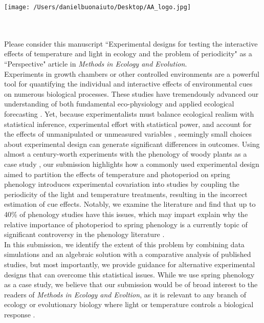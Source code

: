\documentclass[11.5 pt]{article}
\begin{document}


\def\labelitemi{--}
\parindent=24pt
\noindent\texttt{[image: /Users/danielbuonaiuto/Desktop/AA\_logo.jpg]}
\\\\
\\
\vspace{1.5ex}

\noindent Please consider this manuscript ``Experimental designs for testing the interactive effects of temperature and light in ecology and the problem of periodicity" as a ``Perspective" article in \textit{Methods in Ecology and Evolution}.\\

\noindent Experiments in growth chambers or other controlled environments are a powerful tool for quantifying the individual and interactive effects of environmental cues on numerous biological processes. These studies have tremendously advanced our understanding of both fundamental eco-physiology and applied ecological forecasting \citep{Osmond:2004wb}. Yet, because experimentalists must balance ecological realism with statistical inference, experimental effort with statistical power, and account for the effects of unmanipulated or unmeasured variables \citep{schneiner2001}, seemingly small choices about experimental design can generate significant differences in outcomes. Using almost a century-worth experiments with the phenology of woody plants as a case study \citep{wolkovich2019}, our submission highlights how a commonly used experimental design aimed to partition the effects of temperature and photoperiod on spring phenology introduces experimental covariation into studies by coupling the periodicity of the light and temperature treatments, resulting in the incorrect estimation of cue effects. Notably, we examine the literature and find that up to 40\% of phenology studies have this issues, which may impart explain why the relative importance of photoperiod to spring phenology is a currently topic of significant controversy in the phenology literature \citep{koerner2010a,CHUINE:2010wg,Jennifer:2010un,Zohner:2016uz,WAY:2015aa}. \\

\noindent In this submission, we identify the extent of this problem by combining data simulations and an algebraic solution with a comparative analysis of published studies, but most importantly, we provide guidance for alternative experimental designs that can overcome this statistical issues. While we use spring phenology as a case study, we believe that our submission would be of broad interest to the readers of \textit{Methods in Ecology and Evoltion}, as it is relevant to any branch of ecology or evolutionary biology where light or temperature controls a biological response \citep[e.g.,][]{Franklin:2009wo,Brown:2014vn,Casal:2018us}.\\
\end{document}
